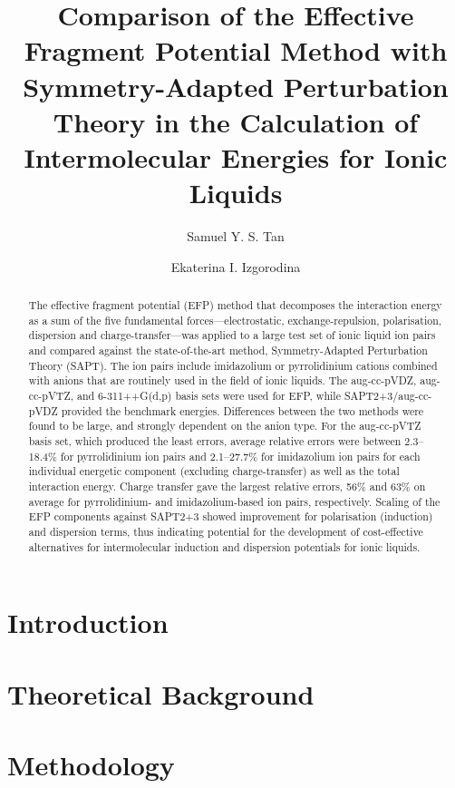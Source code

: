 \documentclass[journal=jctcce]{achemso}
\title{Comparison of the Effective Fragment Potential Method with Symmetry-Adapted Perturbation Theory in the Calculation of Intermolecular Energies for Ionic Liquids}
\author{Samuel Y. S. Tan}
\author{Ekaterina I. Izgorodina}
\affiliation[Monash University]
    {School of Chemistry, Monash University, 17 Rainforest Walk, Clayton, Victoria 3800, AUSTRALIA}
\newcommand{\enUnit}{kJ$ \cdot \text{mol}^{-1}$}
\newcommand{\ipair}[3]{
    \IfEqCase{#3} {
        {bfl} {\ensuremath{[ \text{C}_{\text{#2}}\text{#1}] [ \text{BF}_4 ]}}  
        {br} {\ensuremath{[ \text{C}_{\text{#2}}\text{#1}] [ \text{Br} ]}}
        {cl} {\ensuremath{[ \text{C}_{\text{#2}}\text{#1}] [ \text{Cl} ]}}
        {dca} {\ensuremath{[ \text{C}_{\text{#2}}\text{#1}] [ \text{Dca} ]}}
        {mes} {\ensuremath{[ \text{C}_{\text{#2}}\text{#1}] [ \text{Mes} ]}}
        {ntf} {\ensuremath{[ \text{C}_{\text{#2}}\text{#1}] [ \text{NTf}_{2} ]}} 
        {pf} {\ensuremath{[ \text{C}_{\text{#2}}\text{#1}] [ \text{PF}_6 ]}}
        {tos} {\ensuremath{[ \text{C}_{\text{#2}}\text{#1}] [ \text{Tos} ]}}   
    } 
    [ \PackageError{ipair}{Undefined option (anion) to ipair: #3}{} ]
}
\begin{document}
\maketitle

\begin{abstract}
    The effective fragment potential (EFP) method that decomposes the interaction energy as a sum of the five fundamental forces---electrostatic, exchange-repulsion, polarisation, dispersion and charge-transfer---was applied to a large test set of ionic liquid ion pairs and compared against the state-of-the-art method, Symmetry-Adapted Perturbation Theory (SAPT).
    The ion pairs include imidazolium or pyrrolidinium cations combined with anions that are routinely used in the field of ionic liquids.
    The aug-cc-pVDZ, aug-cc-pVTZ, and 6-311++G(d,p) basis sets were used for EFP, while SAPT2+3/aug-cc-pVDZ provided the benchmark energies.
    Differences between the two methods were found to be large, and strongly dependent on the anion type. 
    For the aug-cc-pVTZ basis set, which produced the least errors, average relative errors were between 2.3--18.4\% for pyrrolidinium ion pairs and 2.1--27.7\% for imidazolium ion pairs for each individual energetic component (excluding charge-transfer) as well as the total interaction energy.
    Charge transfer gave the largest relative errors, 56\% and 63\% on average for pyrrolidinium- and imidazolium-based ion pairs, respectively.
    Scaling of the EFP components against SAPT2+3 showed improvement for polarisation (induction) and dispersion terms, thus indicating potential for the development of cost-effective alternatives for intermolecular induction and dispersion potentials for ionic liquids. 
    
    
\end{abstract}

\section{Introduction}
\label{sec:intro}


\section{Theoretical Background}
\label{sec:bkgrd}


\section{Methodology}
\label{sec:method}

\end{document}
